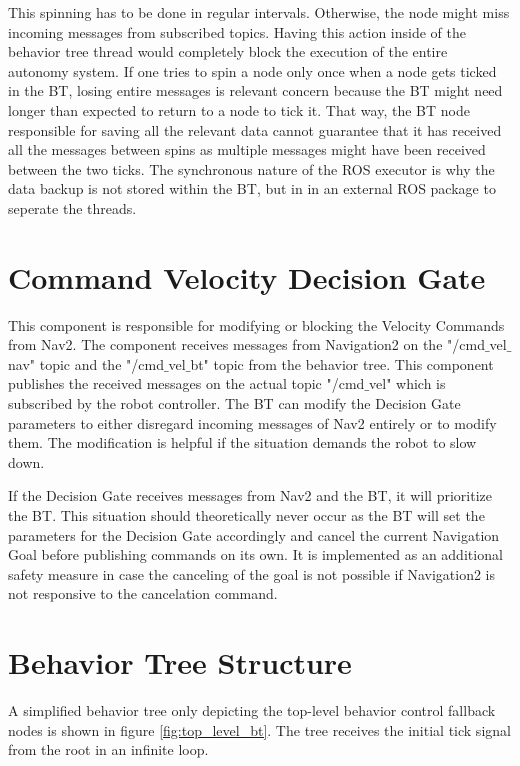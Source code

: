 This spinning has to be done in regular intervals. Otherwise, the node might miss incoming messages from subscribed topics. Having this action inside of the behavior tree thread would completely block the execution of the entire autonomy system. If one tries to spin a node only once when a node gets ticked in the BT, losing entire messages is relevant concern because the BT might need longer than expected to return to a node to tick it. That way, the BT node responsible for saving all the relevant data cannot guarantee that it has received all the messages between spins as multiple messages might have been received between the two ticks. The synchronous nature of the ROS executor is why the data backup is not stored within the BT, but in in an external ROS package to seperate the threads.

\section{Command Velocity Decision Gate}

This component is responsible for modifying or blocking the Velocity Commands from Nav2. The component receives messages from Navigation2 on the "/cmd$\_$vel$\_$nav" topic and the "/cmd$\_$vel$\_$bt" topic from the behavior tree. This component publishes the received messages on the actual topic "/cmd$\_$vel" which is subscribed by the robot controller.  The BT can modify the Decision Gate parameters to either disregard incoming messages of Nav2 entirely or to modify them. The modification is helpful if the situation demands the robot to slow down. 

If the Decision Gate receives messages from Nav2 and the BT, it will prioritize the BT. This situation should theoretically never occur as the BT will set the parameters for the Decision Gate accordingly and cancel the current Navigation Goal before publishing commands on its own. It is implemented as an additional safety measure in case the canceling of the goal is not possible if Navigation2 is not responsive to the cancelation command. 

\section{Behavior Tree Structure}

A simplified behavior tree only depicting the top-level behavior control fallback nodes is shown in figure \ref{fig:top_level_bt}. The tree receives the initial tick signal from the root in an infinite loop. 

